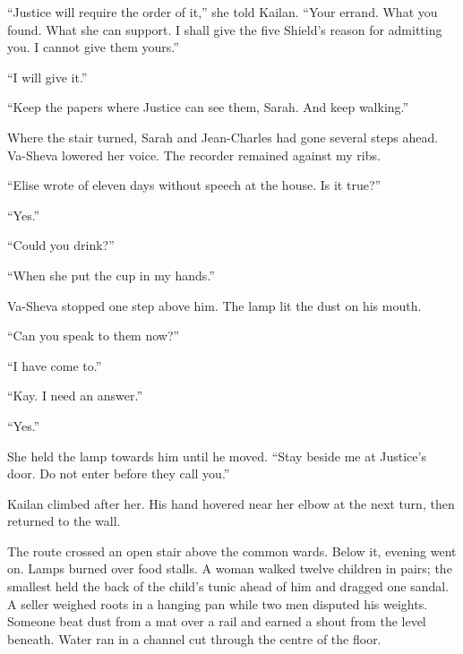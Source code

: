 ``Justice will require the order of it,'' she told Kailan. ``Your errand. What you found. What she can support. I shall give the five Shield's reason for admitting you. I cannot give them yours.''\par

``I will give it.''\par

``Keep the papers where Justice can see them, Sarah. And keep walking.''\par

Where the stair turned, Sarah and Jean-Charles had gone several steps ahead. Va-Sheva lowered her voice. The recorder remained against my ribs.\par

``Elise wrote of eleven days without speech at the house. Is it true?''\par

``Yes.''\par

``Could you drink?''\par

``When she put the cup in my hands.''\par

Va-Sheva stopped one step above him. The lamp lit the dust on his mouth.\par

``Can you speak to them now?''\par

``I have come to.''\par

``Kay. I need an answer.''\par

``Yes.''\par

She held the lamp towards him until he moved. ``Stay beside me at Justice's door. Do not enter before they call you.''\par

Kailan climbed after her. His hand hovered near her elbow at the next turn, then returned to the wall.\par

\ornament

The route crossed an open stair above the common wards. Below it, evening went on. Lamps burned over food stalls. A woman walked twelve children in pairs; the smallest held the back of the child's tunic ahead of him and dragged one sandal. A seller weighed roots in a hanging pan while two men disputed his weights. Someone beat dust from a mat over a rail and earned a shout from the level beneath. Water ran in a channel cut through the centre of the floor.\par

